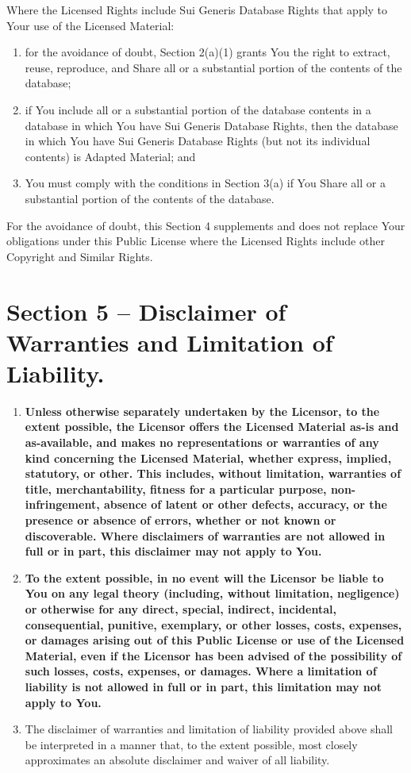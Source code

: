 \documentclass[a4paper, 12pt]{article}
\begin{document}
Where the Licensed Rights include Sui Generis Database Rights that apply to Your use of the Licensed Material:

\begin{enumerate}[label=\alph*.]
\item for the avoidance of doubt, Section 2(a)(1) grants You the right to extract, reuse, reproduce, and Share all or a substantial portion of the contents of the database;
\item if You include all or a substantial portion of the database contents in a database in which You have Sui Generis Database Rights, then the database in which You have Sui Generis Database Rights (but not its individual contents) is Adapted Material; and
\item You must comply with the conditions in Section 3(a) if You Share all or a substantial portion of the contents of the database.
\end{enumerate}

For the avoidance of doubt, this Section 4 supplements and does not replace Your obligations under this Public License where the Licensed Rights include other Copyright and Similar Rights.

\section*{Section 5 – Disclaimer of Warranties and Limitation of Liability.}

\begin{enumerate}[label=\alph*.]
\item \textbf{Unless otherwise separately undertaken by the Licensor, to the extent possible, the Licensor offers the Licensed Material as-is and as-available, and makes no representations or warranties of any kind concerning the Licensed Material, whether express, implied, statutory, or other. This includes, without limitation, warranties of title, merchantability, fitness for a particular purpose, non-infringement, absence of latent or other defects, accuracy, or the presence or absence of errors, whether or not known or discoverable. Where disclaimers of warranties are not allowed in full or in part, this disclaimer may not apply to You.}
\item \textbf{To the extent possible, in no event will the Licensor be liable to You on any legal theory (including, without limitation, negligence) or otherwise for any direct, special, indirect, incidental, consequential, punitive, exemplary, or other losses, costs, expenses, or damages arising out of this Public License or use of the Licensed Material, even if the Licensor has been advised of the possibility of such losses, costs, expenses, or damages. Where a limitation of liability is not allowed in full or in part, this limitation may not apply to You.}
\item The disclaimer of warranties and limitation of liability provided above shall be interpreted in a manner that, to the extent possible, most closely approximates an absolute disclaimer and waiver of all liability.
\end{enumerate}
\end{document}
